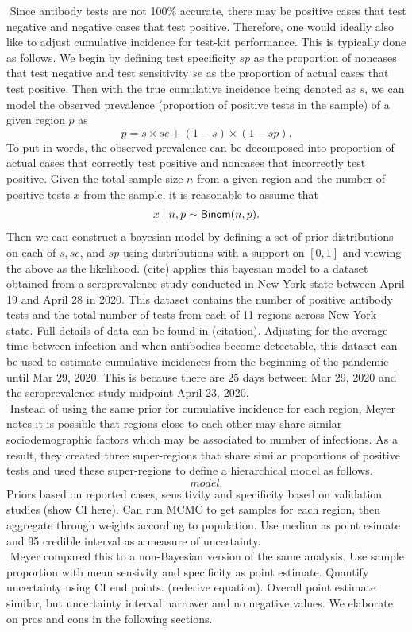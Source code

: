 \newline$ $
Since antibody tests are not 100\% accurate, there may be positive cases that test negative and negative cases that test positive. Therefore, one would ideally also like to adjust cumulative incidence for test-kit performance. This is typically done as follows. We begin by defining test specificity $sp$ as the proportion of noncases that test negative and test sensitivity $se$ as the proportion of actual cases that test positive. Then with the true cumulative incidence being denoted as $s$, we can model the observed prevalence (proportion of positive tests in the sample) of a given region $p$ as
\[
p = s \times se + (1-s) \times (1 - sp).
\]
To put in words, the observed prevalence can be decomposed into proportion of actual cases that correctly test positive and noncases that incorrectly test positive. Given the total sample size $n$ from a given region and the number of positive tests $x$ from the sample, it is reasonable to assume that
\begin{align}
x \mid n, p \sim {\sf{Binom}}(n, p).
\end{align}
Then we can construct a bayesian model by defining a set of prior distributions on each of $s, se$, and $sp$ using distributions with a support on $[0,1]$ and viewing the above as the likelihood. (cite) applies this bayesian model to a dataset obtained from a seroprevalence study conducted in New York state between April 19 and April 28 in 2020. This dataset contains the number of positive antibody tests and the total number of tests from each of 11 regions across New York state. Full details of data can be found in (citation). Adjusting for the average time between infection and when antibodies become detectable, this dataset can be used to estimate cumulative incidences from the beginning of the pandemic until Mar 29, 2020. This is because there are 25 days between Mar 29, 2020 and the seroprevalence study midpoint April 23, 2020.\\
\newline$ $
Instead of using the same prior for cumulative incidence for each region, Meyer notes it is possible that regions close to each other may share similar sociodemographic factors which may be associated to number of infections. As a result, they created three super-regions that share similar proportions of positive tests and used these super-regions to define a hierarchical model as follows. 
\[
model.
\]
Priors based on reported cases, sensitivity and specificity based on validation studies (show CI here). Can run MCMC to get samples for each region, then aggregate through weights according to population. Use median as point esimate and 95 credible interval as a measure of uncertainty.\\
\newline$ $
Meyer compared this to a non-Bayesian version of the same analysis. Use sample proportion with mean sensivity and specificity as point estimate. Quantify uncertainty using CI end points. (rederive equation). Overall point estimate similar, but uncertainty interval narrower and no negative values. We elaborate on pros and cons in the following sections.
